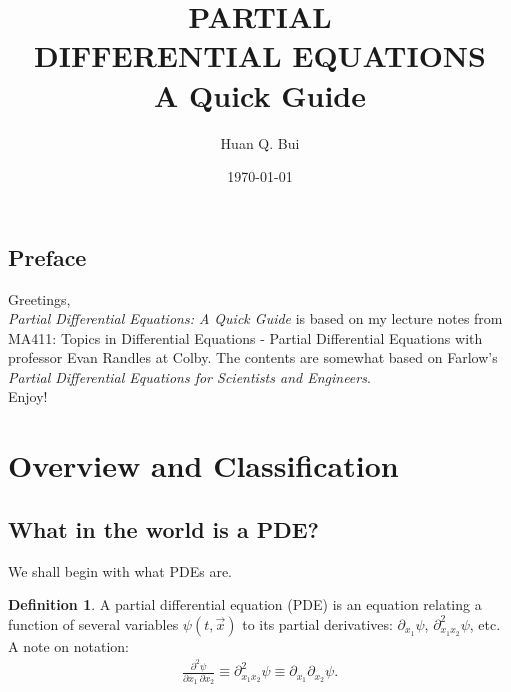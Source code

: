 \documentclass{article}
\theoremstyle{definition}
\newtheorem{defn}{Definition}[section]
\begin{document}
\begin{titlepage}\centering
 \clearpage
 \title{\textsc{\bf{PARTIAL\\ DIFFERENTIAL EQUATIONS}}\\\smallskip A Quick Guide\\}
 \author{\bigskip Huan Q. Bui}
 \date{\today}
 \maketitle
 \thispagestyle{empty}
\end{titlepage}

\subsection*{Preface}

Greetings,\\

\textit{Partial Differential Equations: A Quick Guide} is based on my lecture notes from MA411: Topics in Differential Equations - Partial Differential Equations with professor Evan Randles at Colby. The contents are somewhat based on Farlow's \textit{Partial Differential Equations for Scientists and Engineers}.\\	

Enjoy!

\newpage
\tableofcontents
\newpage

\section{Overview and Classification}



\subsection{What in the world is a PDE?}
We shall begin with what PDEs are. 
\begin{defn}
	A partial differential equation (PDE) is an equation relating a function of several variables $\psi(t,\vec{x})$ to its partial derivatives: $\partial_{x_1}\psi$, $\partial^2_{x_1x_2}\psi$, etc.\\
	
	A note on notation:
	\begin{align*}
	\frac{\partial^2 \psi}{\partial x_1\,\partial x_2} \equiv \partial^2_{x_1x_2}\psi \equiv \partial_{x_1}\partial_{x_2}\psi.
	\end{align*}
\end{defn}
\end{document}
